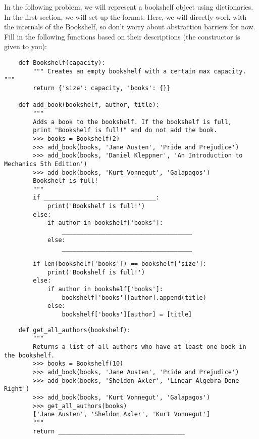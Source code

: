 
    In the following problem, we will represent 
    a bookshelf object using dictionaries.
    \newline
    \newline
    In the first section, we will set up the format. Here, we will directly work with the internals of the
    Bookshelf, so don't worry about abstraction barriers for now. Fill in the following functions based
    on their descriptions (the constructor is given to you):
    
    \begin{lstlisting}
    def Bookshelf(capacity):
        """ Creates an empty bookshelf with a certain max capacity. """
        return {'size': capacity, 'books': {}}

    def add_book(bookshelf, author, title):
        """
        Adds a book to the bookshelf. If the bookshelf is full,
        print "Bookshelf is full!" and do not add the book.
        >>> books = Bookshelf(2)
        >>> add_book(books, 'Jane Austen', 'Pride and Prejudice')
        >>> add_book(books, 'Daniel Kleppner', 'An Introduction to Mechanics 5th Edition')
        >>> add_book(books, 'Kurt Vonnegut', 'Galapagos')
        Bookshelf is full!
        """
        if _______________________________:
            print('Bookshelf is full!')
        else:
            if author in bookshelf['books']:
                ____________________________________
            else:
                ____________________________________
    \end{lstlisting}


    \begin{solution}
        \begin{lstlisting}
        if len(bookshelf['books']) == bookshelf['size']:
            print('Bookshelf is full!')
        else:
            if author in bookshelf['books']:
                bookshelf['books'][author].append(title)
            else:
                bookshelf['books'][author] = [title]
        \end{lstlisting}
    \end{solution}

    \newpage
    \begin{lstlisting}
    def get_all_authors(bookshelf):
        """
        Returns a list of all authors who have at least one book in the bookshelf.
        >>> books = Bookshelf(10)
        >>> add_book(books, 'Jane Austen', 'Pride and Prejudice')
        >>> add_book(books, 'Sheldon Axler', 'Linear Algebra Done Right')
        >>> add_book(books, 'Kurt Vonnegut', 'Galapagos')
        >>> get_all_authors(books)
        ['Jane Austen', 'Sheldon Axler', 'Kurt Vonnegut']
        """
        return ___________________________________
    \end{lstlisting}

